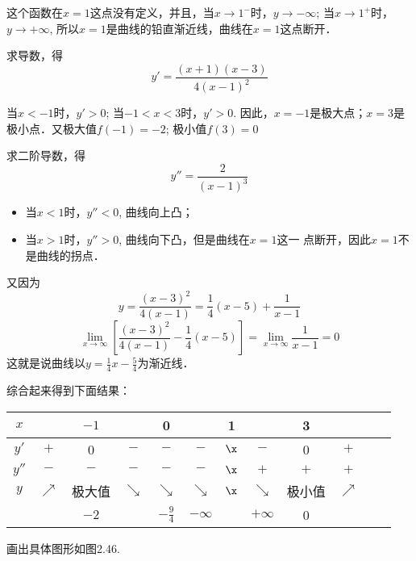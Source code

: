 \begin{solution}
    这个函数在$x=1$这点没有定义，并且，当$x\to 1^-$时，$y\to -\infty$; 当$x\to 1^+$时，$y\to +\infty$, 所以$x=1$是曲线的铅直渐近线，曲线在$x=1$这点断开．
    
求导数，得
\[y'= \frac{(x+1) (x-3)}{4 (x-1)^2}\]

当$x<-1$时，$y'>0$; 当$-1<x<3$时，$y'>0$. 因此，$x=-1$是极大点；$x=3$是极小点．又极大值$f(-1)=-2$; 极小值$f(3)=0$

求二阶导数，得
\[y''=\frac{2}{(x-1)^3}\]
\begin{itemize}
    \item 当$x<1$时，$y''<0$, 曲线向上凸；
    \item 当$x>1$时，$y''>0$, 曲线向下凸，但是曲线在$x=1$这一
    点断开，因此$x=1$不是曲线的拐点．
\end{itemize}

又因为
\[y=\frac{(x-3)^2}{4(x-1)}=\frac{1}{4}(x-5)+\frac{1}{x-1}\]
\[\lim_{x\to \infty}\left[\frac{(x-3)^2}{4(x-1)}-\frac{1}{4}(x-5)\right]=\lim_{x\to\infty}\frac{1}{x-1}=0\]
这就是说曲线以$y=\frac{1}{4}x-\frac{5}{4}$为渐近线．

综合起来得到下面结果：
\begin{center}
    \begin{tabular}{cccccccccccc}
    \hline
    $x$ & &$-1$&&0&&1&&3&\\
    \hline
    $y'$& $+$ & 0&$-$&$-$&$-$&$\x$&$-$&0&$+$\\
    $y''$&$-$&$-$&$-$&$-$&$-$&$\x$&$+$&$+$&$+$\\
    $y$&$\nearrow$ &极大值& $\searrow$  & $\searrow$&$\searrow$ & $\x$& $\searrow$ & 极小值 & $\nearrow$  \\
    &  &$-2$&&$-\frac{9}{4}$&$-\infty $&&$+\infty$&0 &\\
    \hline
    \end{tabular}
    \end{center}

画出具体图形如图2.46.
\begin{figure}[htp]
    \centering
{} 
    \caption{}
\end{figure}
\end{solution}



